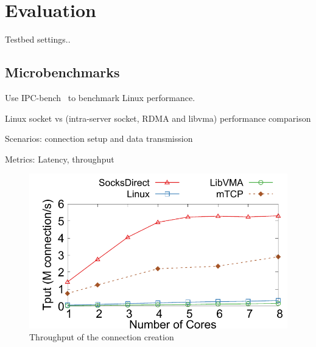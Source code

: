 \section{Evaluation}
\label{sec:evaluation}

Testbed settings..

\subsection{Microbenchmarks}

Use IPC-bench~\cite{ipc-bench} to benchmark Linux performance.

Linux socket vs \sys (intra-server socket, RDMA and libvma) performance comparison

Scenarios: connection setup and data transmission

Metrics: Latency, throughput

\begin{figure}[htpb]
	\centering
	\includegraphics[width=\columnwidth]{eval/microbenchmark/conn-setup-tput.pdf}
	\caption{Throughput of the connection creation}
	\label{fig:eval-conn-setup-tput}
\end{figure}


